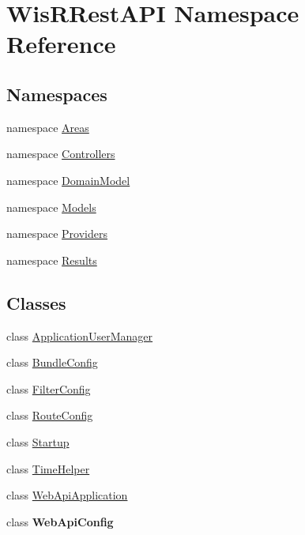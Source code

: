\hypertarget{namespace_wis_r_rest_a_p_i}{}\section{Wis\+R\+Rest\+A\+P\+I Namespace Reference}
\label{namespace_wis_r_rest_a_p_i}
\subsection*{Namespaces}
\begin{DoxyCompactItemize}
\item 
namespace \hyperlink{namespace_wis_r_rest_a_p_i_1_1_areas}{Areas}
\item 
namespace \hyperlink{namespace_wis_r_rest_a_p_i_1_1_controllers}{Controllers}
\item 
namespace \hyperlink{namespace_wis_r_rest_a_p_i_1_1_domain_model}{Domain\+Model}
\item 
namespace \hyperlink{namespace_wis_r_rest_a_p_i_1_1_models}{Models}
\item 
namespace \hyperlink{namespace_wis_r_rest_a_p_i_1_1_providers}{Providers}
\item 
namespace \hyperlink{namespace_wis_r_rest_a_p_i_1_1_results}{Results}
\end{DoxyCompactItemize}
\subsection*{Classes}
\begin{DoxyCompactItemize}
\item 
class \hyperlink{class_wis_r_rest_a_p_i_1_1_application_user_manager}{Application\+User\+Manager}
\item 
class \hyperlink{class_wis_r_rest_a_p_i_1_1_bundle_config}{Bundle\+Config}
\item 
class \hyperlink{class_wis_r_rest_a_p_i_1_1_filter_config}{Filter\+Config}
\item 
class \hyperlink{class_wis_r_rest_a_p_i_1_1_route_config}{Route\+Config}
\item 
class \hyperlink{class_wis_r_rest_a_p_i_1_1_startup}{Startup}
\item 
class \hyperlink{class_wis_r_rest_a_p_i_1_1_time_helper}{Time\+Helper}
\item 
class \hyperlink{class_wis_r_rest_a_p_i_1_1_web_api_application}{Web\+Api\+Application}
\item 
class {\bfseries Web\+Api\+Config}
\end{DoxyCompactItemize}
